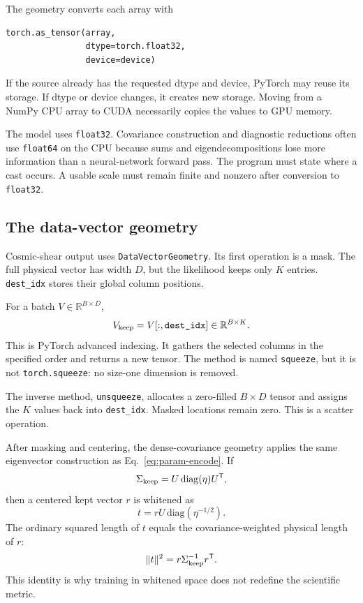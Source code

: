 \documentclass[10pt,aps,prd,twocolumn,nofootinbib]{revtex4-2}
\newcommand{\code}[1]{\texttt{#1}}
\begin{document}
The geometry converts each array with
\begin{verbatim}
torch.as_tensor(array,
                dtype=torch.float32,
                device=device)
\end{verbatim}
If the source already has the requested dtype and device, PyTorch may reuse
its storage.  If dtype or device changes, it creates new storage.  Moving from
a NumPy CPU array to CUDA necessarily copies the values to GPU memory.

The model uses \code{float32}.  Covariance construction and diagnostic
reductions often use \code{float64} on the CPU because sums and
eigendecompositions lose more information than a neural-network forward pass.
The program must state where a cast occurs.  A usable scale must remain finite
and nonzero after conversion to \code{float32}.

\subsection{The data-vector geometry}

Cosmic-shear output uses \code{DataVectorGeometry}.  Its first operation is a
mask.  The full physical vector has width $D$, but the likelihood keeps only
$K$ entries.  \code{dest\_idx} stores their global column positions.

For a batch $V\in\mathbb{R}^{B\times D}$,
\begin{equation*}
  V_{\rm keep}=V[:,\code{dest\_idx}]
  \in\mathbb{R}^{B\times K}.
\end{equation*}
This is PyTorch advanced indexing.  It gathers the selected columns in the
specified order and returns a new tensor.  The method is named
\code{squeeze}, but it is not \code{torch.squeeze}: no size-one dimension is
removed.

The inverse method, \code{unsqueeze}, allocates a zero-filled
$B\times D$ tensor and assigns the $K$ values back into
\code{dest\_idx}.  Masked locations remain zero.  This is a scatter
operation.

After masking and centering, the dense-covariance geometry applies the same
eigenvector construction as Eq.~\eqref{eq:param-encode}.  If
\begin{equation}
  \Sigma_{\rm keep}=U\,\mathrm{diag}(\eta)U^{\mathsf T},
\end{equation}
then a centered kept vector $r$ is whitened as
\begin{equation}
  t=rU\,\mathrm{diag}(\eta^{-1/2}).
\end{equation}
The ordinary squared length of $t$ equals the covariance-weighted physical
length of $r$:
\begin{equation}
  \lVert t\rVert^2 = r \Sigma_{\rm keep}^{-1} r^{\mathsf T}.
  \label{eq:whiten-chi2}
\end{equation}
This identity is why training in whitened space does not redefine the
scientific metric.
\end{document}
